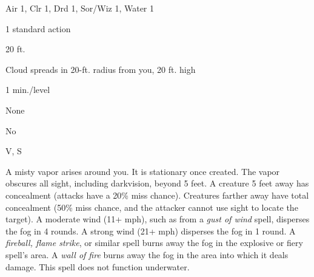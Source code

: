 
\begin{description*}
\item[Level:] Air 1, Clr 1, Drd 1, Sor/Wiz 1, Water 1
\item[Casting Time:] 1 standard action
\item[Range:] 20 ft.
\item[Effect:] Cloud spreads in 20-ft. radius from you, 20 ft. high
\item[Duration:] 1 min./level
\item[Saving Throw:] None
\item[Spell Resistance:] No
\item[Components:] V, S
\end{description*}

A misty vapor arises around you. It is stationary once created. The vapor obscures
all sight, including darkvision, beyond 5 feet. A creature 5 feet away has concealment
(attacks have a 20\% miss chance). Creatures farther away have total concealment
(50\% miss chance, and the attacker cannot use sight to locate the target).
A moderate wind (11+ mph), such as from a \textit{gust of wind} spell, disperses
the fog in 4 rounds. A strong wind (21+ mph) disperses the fog in 1 round. A \textit{fireball,
flame strike}, or similar spell burns away the fog in the explosive or fiery spell's
area. A \textit{wall of fire} burns away the fog in the area into which it deals
damage.
This spell does not function underwater.
